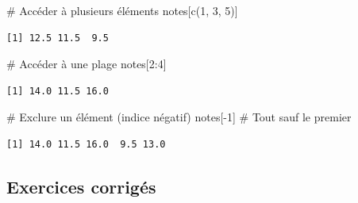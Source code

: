 \documentclass[
  french,
  11pt,
  a4paper,
]{article}
\newenvironment{Shaded}{}{}
\newcommand{\CommentTok}[1]{\textcolor[rgb]{0.42,0.45,0.49}{#1}}
\newcommand{\DecValTok}[1]{\textcolor[rgb]{0.00,0.36,0.77}{#1}}
\newcommand{\FunctionTok}[1]{\textcolor[rgb]{0.44,0.26,0.76}{#1}}
\newcommand{\NormalTok}[1]{\textcolor[rgb]{0.14,0.16,0.18}{#1}}
\newcommand{\SpecialCharTok}[1]{\textcolor[rgb]{0.00,0.36,0.77}{#1}}
\begin{document}
\begin{Shaded}
\begin{Highlighting}[]
\CommentTok{\# Accéder à plusieurs éléments}
\NormalTok{notes[}\FunctionTok{c}\NormalTok{(}\DecValTok{1}\NormalTok{, }\DecValTok{3}\NormalTok{, }\DecValTok{5}\NormalTok{)]}
\end{Highlighting}
\end{Shaded}

\begin{verbatim}
[1] 12.5 11.5  9.5
\end{verbatim}

\begin{Shaded}
\begin{Highlighting}[]
\CommentTok{\# Accéder à une plage}
\NormalTok{notes[}\DecValTok{2}\SpecialCharTok{:}\DecValTok{4}\NormalTok{]}
\end{Highlighting}
\end{Shaded}

\begin{verbatim}
[1] 14.0 11.5 16.0
\end{verbatim}

\begin{Shaded}
\begin{Highlighting}[]
\CommentTok{\# Exclure un élément (indice négatif)}
\NormalTok{notes[}\SpecialCharTok{{-}}\DecValTok{1}\NormalTok{]   }\CommentTok{\# Tout sauf le premier}
\end{Highlighting}
\end{Shaded}

\begin{verbatim}
[1] 14.0 11.5 16.0  9.5 13.0
\end{verbatim}

\subsection{Exercices corrigés}\label{exercices-corriguxe9s-1}
\end{document}
